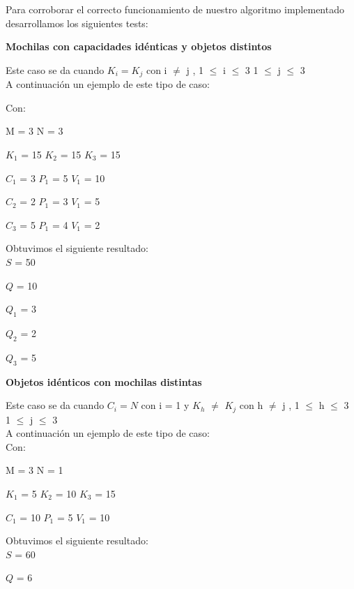 \indent Para corroborar el correcto funcionamiento de nuestro algoritmo implementado desarrollamos los siguientes tests:\\


\begin{center}
 \textbf{Mochilas con capacidades id\'enticas y objetos distintos}
\end{center}

Este caso se da cuando $K_{i} = K_{j}$ con i $\neq$ j , 1 $\leq$ i $\leq$ 3  1 $\leq$ j $\leq$ 3  \\

A continuaci\'on un ejemplo de este tipo de caso:

Con:

M = 3 N = 3

$K_{1}$ = 15  $K_{2}$ = 15  $K_{3}$ = 15 

$C_{1}$ = 3 $P_{1}$ = 5 $V_{1}$ = 10

$C_{2}$ = 2 $P_{1}$ = 3 $V_{1}$ = 5

$C_{3}$ = 5 $P_{1}$ = 4 $V_{1}$ = 2
  
  \indent  
  
  Obtuvimos el siguiente resultado:\\

$S$ = 50

$Q$ = 10

$Q_{1}$ = 3

$Q_{2}$ = 2

$Q_{3}$ = 5


\begin{center}
 \textbf{Objetos id\'enticos con mochilas distintas}
\end{center}

Este caso se da cuando $C_{i} = N$ con i = 1 y $K_{h}$ $\neq$ $K_{j}$ con h $\neq$ j , 1 $\leq$ h $\leq$ 3  1 $\leq$ j $\leq$ 3 \\

A continuaci\'on un ejemplo de este tipo de caso:\\

 Con:
 
 M = 3 N = 1
 
 $K_{1}$ = 5  $K_{2}$ = 10  $K_{3}$ = 15
 
 $C_{1}$ = 10 $P_{1}$ = 5 $V_{1}$ = 10
  
  \indent  
  
  Obtuvimos el siguiente resultado:\\

$S$ = 60

$Q$ = 6

